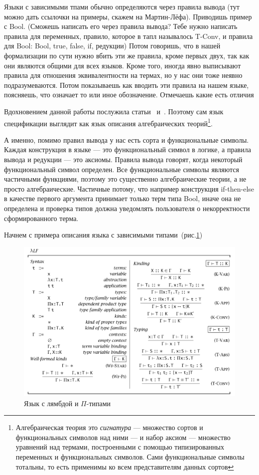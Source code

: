 Языки с зависимыми тпами обычно определяются через правила вывода (тут можно дать ссылочки на примеры, скажем на Мартин-Лёфа). Приводишь пример с Bool. (Сможешь написать его через правила вывода? Тебе нужно написать правила для переменных, правило, которое в тапл называлось T-Conv, и правила для Bool: Bool, true, false, if, редукции) Потом говоришь, что в нашей формализации по сути нужно вбить эти же правила, кроме первых двух, так как они являются общими для всех языков. Кроме того, иногда явно выписывают правила для отношения эквивалентности на термах, но у нас они тоже неявно подразумеваются. Потом показываешь как вводить эти правила на нашем языке, поясняешь, что означает то или иное обозначение. Отмечаешь какие есть отличия


Вдохновением данной работы послужила статьи~\cite{Palmgren} и~\cite{isaev}. Поэтому сам язык спецификации выглядит как язык описания алгебраических теорий\footnote{Алгебраическая теория это \textit{сигнатура} --- множество сортов и функциональных символов над ними --- и набор аксиом --- множество уравнений над термами, построенными с помощью типизированных переменных и функциональных символов. Сами функциональные символы тотальны, то есть применимы ко всем представителям данных сортов}.

А именно, помимо правил вывода у нас есть сорта и функциональные символы. Каждая конструкция в языке --- это функциональный символ в логике, а правила вывода и редукции --- это аксиомы. Правила вывода говорят, когда некоторый функциональный символ определен. Все функциональные символы являются частичными функциями, поэтому это существенно алгебраические теории, а не просто алгебраические. Частичные потому, что например конструкция if-then-else в качестве первого аргумента принимает только терм типа Bool, иначе она не определена и проверка типов должна уведомлять пользователя о некорректности сформированного терма.

Начнем с примера описания языка с зависимыми типами~(рис.\ref{lpi})~\cite[Глава~2.1]{book:pierce}

\begin{figure}
    \centering
	\includegraphics[scale=0.35]{img/lp.png}
	\caption{Язык с лямбдой и $\Pi$-типами }
	\label{lpi}
\end{figure}

